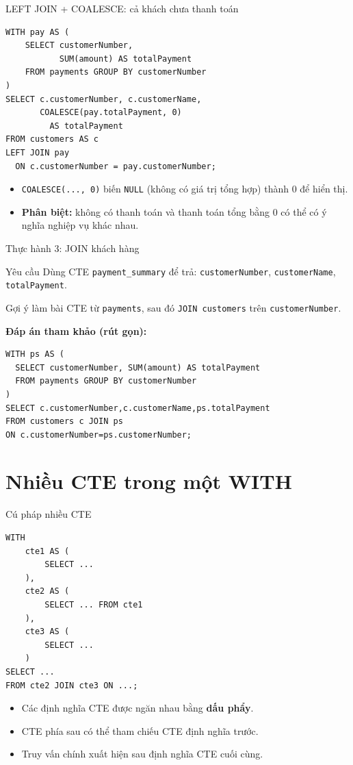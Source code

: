 \documentclass[aspectratio=169,10pt]{beamer}
\newcommand{\code}[1]{\texttt{#1}}
\begin{document}
\begin{frame}[fragile]{LEFT JOIN + COALESCE: cả khách chưa thanh toán}
\small
\begin{lstlisting}[basicstyle=\ttfamily\scriptsize]
WITH pay AS (
    SELECT customerNumber,
           SUM(amount) AS totalPayment
    FROM payments GROUP BY customerNumber
)
SELECT c.customerNumber, c.customerName,
       COALESCE(pay.totalPayment, 0)
         AS totalPayment
FROM customers AS c
LEFT JOIN pay
  ON c.customerNumber = pay.customerNumber;
\end{lstlisting}
\vspace{.1em}
\begin{itemize}
\item \code{COALESCE(..., 0)} biến \code{NULL} (không có giá trị tổng hợp) thành 0 để hiển thị.
\item \textbf{Phân biệt:} không có thanh toán và thanh toán tổng bằng 0 có thể có ý nghĩa nghiệp vụ khác nhau.
\end{itemize}
\end{frame}

\begin{frame}[fragile]{Thực hành 3: JOIN khách hàng}
\begin{block}{Yêu cầu}
Dùng CTE \code{payment\_summary} để trả: \code{customerNumber}, \code{customerName}, \code{totalPayment}.
\end{block}
\begin{alertblock}{Gợi ý làm bài}
CTE từ \code{payments}, sau đó \code{JOIN customers} trên \code{customerNumber}.
\end{alertblock}
\textbf{Đáp án tham khảo (rút gọn):}
\begin{lstlisting}[basicstyle=\ttfamily\scriptsize]
WITH ps AS (
  SELECT customerNumber, SUM(amount) AS totalPayment
  FROM payments GROUP BY customerNumber
)
SELECT c.customerNumber,c.customerName,ps.totalPayment
FROM customers c JOIN ps
ON c.customerNumber=ps.customerNumber;
\end{lstlisting}
\end{frame}

\section{Nhiều CTE trong một WITH}

\begin{frame}[fragile]{Cú pháp nhiều CTE}
\small
\begin{lstlisting}[basicstyle=\ttfamily\scriptsize]
WITH
    cte1 AS (
        SELECT ...
    ),
    cte2 AS (
        SELECT ... FROM cte1
    ),
    cte3 AS (
        SELECT ...
    )
SELECT ...
FROM cte2 JOIN cte3 ON ...;
\end{lstlisting}
\vspace{.1em}
\begin{itemize}
\item Các định nghĩa CTE được ngăn nhau bằng \textbf{dấu phẩy}.
\item CTE phía sau có thể tham chiếu CTE định nghĩa trước.
\item Truy vấn chính xuất hiện sau định nghĩa CTE cuối cùng.
\end{itemize}
\end{frame}
\end{document}
